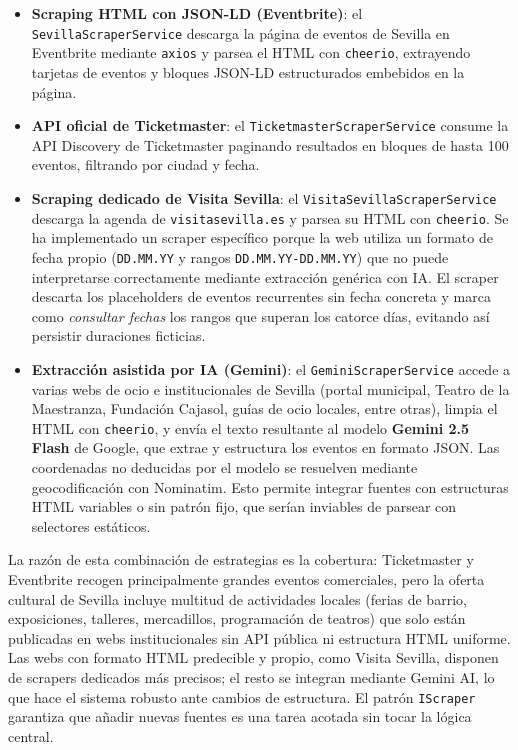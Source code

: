 \begin{itemize}
    \item \textbf{Scraping HTML con JSON-LD (Eventbrite)}: el \texttt{SevillaScraperService} descarga la página de eventos de Sevilla en Eventbrite mediante \texttt{axios} y parsea el HTML con \texttt{cheerio}, extrayendo tarjetas de eventos y bloques JSON-LD estructurados embebidos en la página.
    \item \textbf{API oficial de Ticketmaster}: el \texttt{TicketmasterScraperService} consume la API Discovery de Ticketmaster paginando resultados en bloques de hasta 100 eventos, filtrando por ciudad y fecha.
    \item \textbf{Scraping dedicado de Visita Sevilla}: el \texttt{VisitaSevillaScraperService} descarga la agenda de \texttt{visitasevilla.es} y parsea su HTML con \texttt{cheerio}. Se ha implementado un scraper específico porque la web utiliza un formato de fecha propio (\texttt{DD.MM.YY} y rangos \texttt{DD.MM.YY-DD.MM.YY}) que no puede interpretarse correctamente mediante extracción genérica con IA. El scraper descarta los placeholders de eventos recurrentes sin fecha concreta y marca como \textit{consultar fechas} los rangos que superan los catorce días, evitando así persistir duraciones ficticias.
    \item \textbf{Extracción asistida por IA (Gemini)}: el \texttt{GeminiScraperService} accede a varias webs de ocio e institucionales de Sevilla (portal municipal, Teatro de la Maestranza, Fundación Cajasol, guías de ocio locales, entre otras), limpia el HTML con \texttt{cheerio}, y envía el texto resultante al modelo \textbf{Gemini 2.5 Flash} de Google, que extrae y estructura los eventos en formato JSON. Las coordenadas no deducidas por el modelo se resuelven mediante geocodificación con Nominatim. Esto permite integrar fuentes con estructuras HTML variables o sin patrón fijo, que serían inviables de parsear con selectores estáticos.
\end{itemize}

La razón de esta combinación de estrategias es la cobertura: Ticketmaster y Eventbrite recogen principalmente grandes eventos comerciales, pero la oferta cultural de Sevilla incluye multitud de actividades locales (ferias de barrio, exposiciones, talleres, mercadillos, programación de teatros) que solo están publicadas en webs institucionales sin API pública ni estructura HTML uniforme. Las webs con formato HTML predecible y propio, como Visita Sevilla, disponen de scrapers dedicados más precisos; el resto se integran mediante Gemini AI, lo que hace el sistema robusto ante cambios de estructura. El patrón \texttt{IScraper} garantiza que añadir nuevas fuentes es una tarea acotada sin tocar la lógica central.

